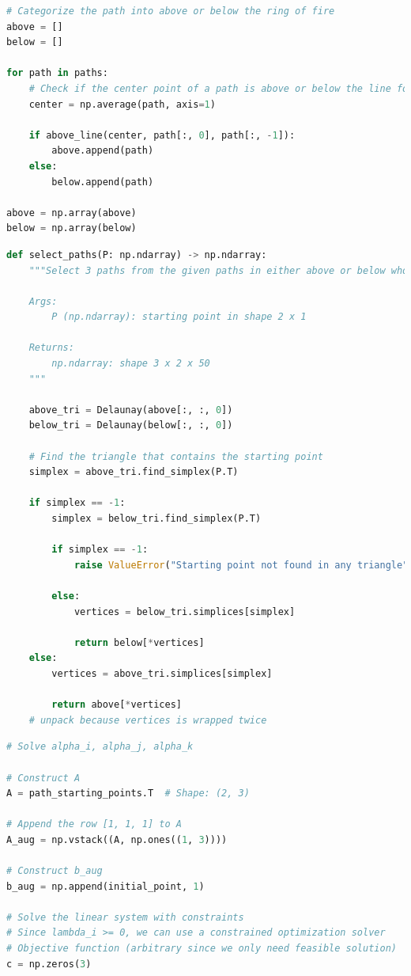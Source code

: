 \documentclass[conference,onecolumn]{IEEEtran}
\begin{document}
\begin{enumerate}[label=\arabic{enumi}.]
\begin{enumerate}
\begin{lstlisting}[language=Python]
# Categorize the path into above or below the ring of fire
above = []
below = []

for path in paths:
    # Check if the center point of a path is above or below the line formed by connecting starting and ending points
    center = np.average(path, axis=1)

    if above_line(center, path[:, 0], path[:, -1]):
        above.append(path)
    else:
        below.append(path)

above = np.array(above)
below = np.array(below)
                    \end{lstlisting}
                    \begin{lstlisting}[language=Python]
def select_paths(P: np.ndarray) -> np.ndarray:
    """Select 3 paths from the given paths in either above or below whose starting points surround the input starting point

    Args:
        P (np.ndarray): starting point in shape 2 x 1

    Returns:
        np.ndarray: shape 3 x 2 x 50
    """

    above_tri = Delaunay(above[:, :, 0])
    below_tri = Delaunay(below[:, :, 0])

    # Find the triangle that contains the starting point
    simplex = above_tri.find_simplex(P.T)

    if simplex == -1:
        simplex = below_tri.find_simplex(P.T)

        if simplex == -1:
            raise ValueError("Starting point not found in any triangle")

        else:
            vertices = below_tri.simplices[simplex]

            return below[*vertices]
    else:
        vertices = above_tri.simplices[simplex]

        return above[*vertices]
    # unpack because vertices is wrapped twice
                    \end{lstlisting}
                    \begin{lstlisting}[language=Python]
# Solve alpha_i, alpha_j, alpha_k

# Construct A
A = path_starting_points.T  # Shape: (2, 3)

# Append the row [1, 1, 1] to A
A_aug = np.vstack((A, np.ones((1, 3))))

# Construct b_aug
b_aug = np.append(initial_point, 1)

# Solve the linear system with constraints
# Since lambda_i >= 0, we can use a constrained optimization solver
# Objective function (arbitrary since we only need feasible solution)
c = np.zeros(3)


\end{lstlisting}
\end{enumerate}
\end{enumerate}
\end{document}
